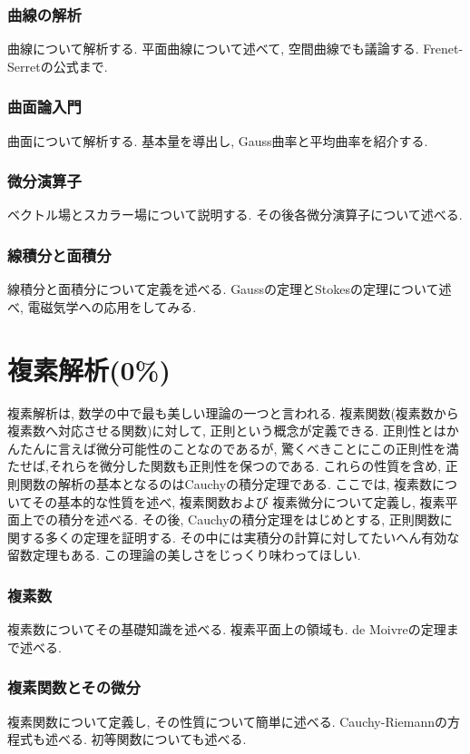 \documentclass[a4j,dvipdfmx]{jsarticle}
\numberwithin{equation}{section}
\begin{document}
    \section{曲線の解析}
        曲線について解析する. 平面曲線について述べて, 空間曲線でも議論する. Frenet-Serretの公式まで.
    \clearpage
    \section{曲面論入門}
        曲面について解析する. 基本量を導出し, Gauss曲率と平均曲率を紹介する.
    \clearpage
    \section{微分演算子}
        ベクトル場とスカラー場について説明する. その後各微分演算子について述べる.
    \clearpage
    \section{線積分と面積分}
        線積分と面積分について定義を述べる. Gaussの定理とStokesの定理について述べ, 電磁気学への応用をしてみる.
    \clearpage

    \part{複素解析(0\%)}
    \begin{screen}
        複素解析は, 数学の中で最も美しい理論の一つと言われる. 複素関数(複素数から複素数へ対応させる関数)に対して, 正則という概念が定義できる.
        正則性とはかんたんに言えば微分可能性のことなのであるが, 驚くべきことにこの正則性を満たせば,それらを微分した関数も正則性を保つのである. 
        これらの性質を含め, 正則関数の解析の基本となるのはCauchyの積分定理である. ここでは, 複素数についてその基本的な性質を述べ, 複素関数および
        複素微分について定義し, 複素平面上での積分を述べる. その後, Cauchyの積分定理をはじめとする, 正則関数に関する多くの定理を証明する.
        その中には実積分の計算に対してたいへん有効な留数定理もある. この理論の美しさをじっくり味わってほしい.
    \end{screen}
    \clearpage
    \section{複素数}
        複素数についてその基礎知識を述べる. 複素平面上の領域も. de Moivreの定理まで述べる.
    \clearpage
    \section{複素関数とその微分}
        複素関数について定義し, その性質について簡単に述べる. Cauchy-Riemannの方程式も述べる. 初等関数についても述べる.
    \clearpage
\end{document}
